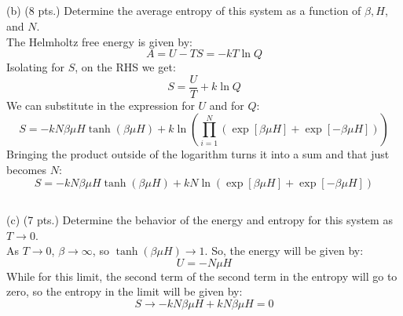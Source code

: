 \documentclass[10pt]{article}
\begin{document}
\subsection{}
(b) (8 pts.) Determine the average entropy of this system as a function of $\beta, H$, and $N$.\\
The Helmholtz free energy is given by:
\begin{equation}
  A = U - TS = -kT \ln Q
\end{equation}
Isolating for $S$, on the RHS we get:
\begin{equation}
  S = \frac{U}{T} + k \ln Q
\end{equation}
We can substitute in the expression for $U$ and for $Q$:
\begin{equation}
  S = - k N \beta \mu H \tanh \left( \beta \mu H \right) + k \ln \left( \prod_{i = 1}^{N} \left( \exp \left[ \beta \mu H \right] + \exp \left[ - \beta \mu H \right] \right) \right)
\end{equation}
Bringing the product outside of the logarithm turns it into a sum and that just becomes $N$:
\begin{equation}
  S = - k N \beta \mu H \tanh \left( \beta \mu H \right) + k N \ln \left( \exp \left[ \beta \mu H \right] + \exp \left[ - \beta \mu H \right] \right)
\end{equation}
\subsection{}


(c) (7 pts.) Determine the behavior of the energy and entropy for this system as $T \rightarrow 0$.\\
As $T \rightarrow 0$, $\beta \rightarrow \infty$, so $\tanh \left( \beta \mu H \right) \rightarrow 1$. So, the energy will be given by:
\begin{equation}
  U = - N \mu H
\end{equation}
While for this limit, the second term of the second term in the entropy will go to zero, so the entropy in the limit will be given by:
\begin{equation}
  S \rightarrow -kN \beta \mu H + kN \beta \mu H = 0
\end{equation}
\end{document}
